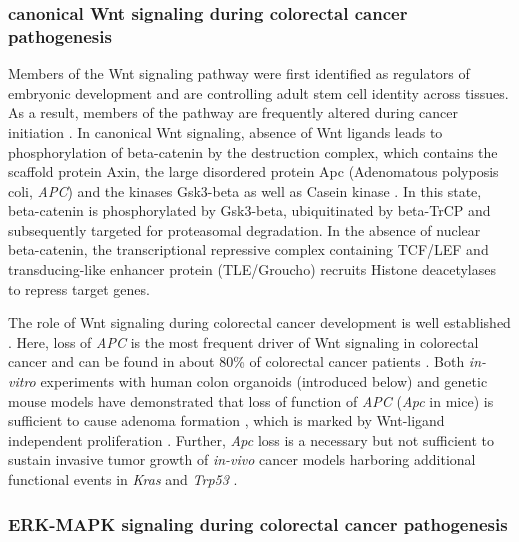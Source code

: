 \begin{flushleft}
\subsubsection{canonical Wnt signaling during colorectal cancer pathogenesis}

Members of the Wnt signaling pathway were first identified as regulators of embryonic development \citep{sharmaEffectWinglessWg11976, nusslein-volhardMutationsAffectingSegment1980} and are controlling adult stem cell identity across tissues. As a result, members of the pathway are frequently altered during cancer initiation \citep{zhanWntSignalingCancer2017}. In canonical Wnt signaling, absence of Wnt ligands leads to phosphorylation of beta-catenin by the destruction complex, which contains the scaffold protein Axin, the large disordered protein Apc (Adenomatous polyposis coli, \textit{APC}) and the kinases Gsk3-beta as well as Casein kinase \citep{zhanWntSignalingCancer2017}. 
In this state, beta-catenin is phosphorylated by Gsk3-beta, ubiquitinated by beta-TrCP and subsequently targeted for proteasomal degradation. In the absence of nuclear beta-catenin, the transcriptional repressive complex containing TCF/LEF and transducing-like enhancer protein (TLE/Groucho) recruits Histone deacetylases to repress target genes. \par 

The role of Wnt signaling during colorectal cancer development is well established \citep{polakisManyWaysWnt2007}. Here, loss of \textit{APC} is the most frequent driver of Wnt signaling in colorectal cancer and can be found in about 80\% of colorectal cancer patients \citep{fearonMolecularGeneticsColorectal2011, zhanWntSignalingCancer2017}. Both \textit{in-vitro} experiments with human colon organoids (introduced below) and genetic mouse models have demonstrated that loss of function of \textit{APC} (\textit{Apc} in mice) is sufficient to cause adenoma formation \citep{moserApcMinMouseModel1995}, which is marked by Wnt-ligand independent proliferation \citep{matanoModelingColorectalCancer2015a, drostSequentialCancerMutations2015}. Further, \textit{Apc} loss is a necessary but not sufficient to sustain invasive tumor growth of \textit{in-vivo} cancer models harboring additional functional events in \textit{Kras} and \textit{Trp53} \citep{dowApcRestorationPromotes2015a, sakaiCombinedMutationApc2018a}.
\par

\subsubsection{ERK-MAPK signaling during colorectal cancer pathogenesis}


\end{flushleft}
